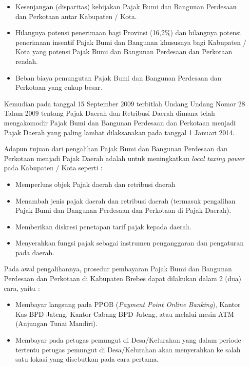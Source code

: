 \documentclass[pdftex,12pt, oneside]{article}
\begin{document}
\begin{itemize}
	\item Kesenjangan (disparitas) kebijakan Pajak Bumi dan Bangunan Perdesaan dan Perkotaan antar Kabupaten / Kota.
	\item Hilangnya potensi penerimaan bagi Provinsi (16,2\%) dan hilangnya potensi penerimaan insentif Pajak Bumi dan Bangunan khususnya bagi Kabupaten / Kota yang potensi Pajak Bumi dan Bangunan Perdesaan dan Perkotaan rendah.
	\item Beban biaya pemungutan Pajak Bumi dan Bangunan Perdesaan dan Perkotaan yang cukup besar.
\end{itemize}

Kemudian pada tanggal 15 September 2009 terbitlah Undang Undang Nomor 28 Tahun 2009 tentang Pajak Daerah dan Retribusi Daerah dimana telah mengakomodir Pajak Bumi dan Bangunan Perdesaan dan Perkotaan menjadi Pajak Daerah yang paling lambat dilaksanakan pada tanggal 1 Januari 2014. 

Adapun tujuan dari pengalihan Pajak Bumi dan Bangunan Perdesaan dan Perkotaan menjadi Pajak Daerah adalah untuk meningkatkan \textit{local taxing power} pada Kabupaten / Kota seperti :

\begin{itemize}
	\item Memperluas objek Pajak daerah dan retribusi daerah
	\item Menambah jenis pajak daerah dan retribusi daerah (termasuk pengalihan Pajak Bumi dan Bangunan Perdesaan dan Perkotaan di Pajak Daerah).
	\item Memberikan diskresi penetapan tarif pajak kepada daerah.
	\item Menyerahkan fungsi pajak sebagai instrumen penganggaran dan pengaturan pada daerah.
\end{itemize}

Pada awal pengalihannya, prosedur pembayaran Pajak Bumi dan Bangunan Perdesaan dan Perkotaan di Kabupaten Brebes dapat dilakukan dalam 2 (dua) cara, yaitu : 

\begin{itemize}
	\item Membayar langsung pada PPOB (\textit{Payment Point Online Banking}), Kantor Kas BPD Jateng, Kantor Cabang BPD Jateng, atau melalui mesin ATM (Anjungan Tunai Mandiri).
	\item Membayar pada petugas pemungut di Desa/Kelurahan yang dalam periode tertentu petugas pemungut di Desa/Kelurahan akan menyerahkan ke salah satu lokasi yang disebutkan pada cara pertama.
\end{itemize}
\end{document}
